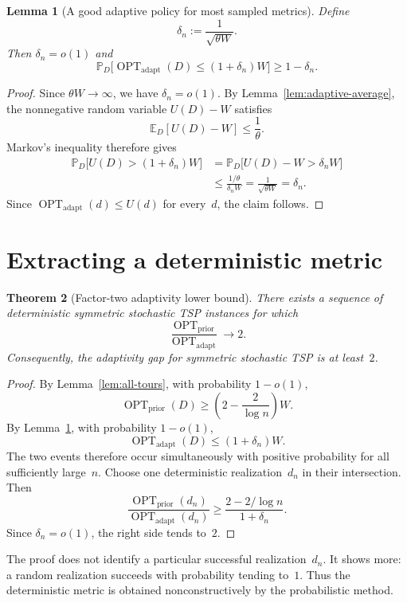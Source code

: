 \documentclass[11pt]{article}
\newtheorem{theorem}{Theorem}[section]
\newtheorem{lemma}[theorem]{Lemma}
\theoremstyle{remark}
\newcommand{\E}{\mathbb{E}}
\newcommand{\Prob}{\mathbb{P}}
\newcommand{\optadapt}{\operatorname{OPT}_{\mathrm{adapt}}}
\newcommand{\optprior}{\operatorname{OPT}_{\mathrm{prior}}}
\begin{document}
\begin{lemma}[A good adaptive policy for most sampled metrics]
\label{lem:adaptive-whp}
Define
\[
    \delta_n:=\frac{1}{\sqrt{\theta W}}.
\]
Then $\delta_n=o(1)$ and
\[
    \Prob_D\bigl[\optadapt(D)\leq(1+\delta_n)W\bigr]
    \geq 1-\delta_n.
\]
\end{lemma}

\begin{proof}
Since $\theta W\to\infty$, we have $\delta_n=o(1)$.  By
Lemma~\ref{lem:adaptive-average}, the nonnegative random variable $U(D)-W$
satisfies
\[
    \E_D[U(D)-W]\leq\frac{1}{\theta}.
\]
Markov's inequality therefore gives
\begin{align*}
    \Prob_D\bigl[U(D)>(1+\delta_n)W\bigr]
    &=
    \Prob_D\bigl[U(D)-W>\delta_nW\bigr]\\
    &\leq
    \frac{1/\theta}{\delta_nW}
    =\frac{1}{\sqrt{\theta W}}
    =\delta_n.
\end{align*}
Since $\optadapt(d)\leq U(d)$ for every~$d$, the claim follows.
\end{proof}

\section{Extracting a deterministic metric}

\begin{theorem}[Factor-two adaptivity lower bound]\label{thm:main}
There exists a sequence of deterministic symmetric stochastic TSP instances
for which
\[
    \frac{\optprior}{\optadapt}\longrightarrow 2.
\]
Consequently, the adaptivity gap for symmetric stochastic TSP is at least~$2$.
\end{theorem}

\begin{proof}
By Lemma~\ref{lem:all-tours}, with probability $1-o(1)$,
\[
    \optprior(D)\geq
    \left(2-\frac{2}{\log n}\right)W.
\]
By Lemma~\ref{lem:adaptive-whp}, with probability $1-o(1)$,
\[
    \optadapt(D)\leq(1+\delta_n)W.
\]
The two events therefore occur simultaneously with positive probability for all
sufficiently large~$n$.  Choose one deterministic realization~$d_n$ in their
intersection.  Then
\[
    \frac{\optprior(d_n)}{\optadapt(d_n)}
    \geq
    \frac{2-2/\log n}{1+\delta_n}.
\]
Since $\delta_n=o(1)$, the right side tends to~$2$.
\end{proof}

The proof does not identify a particular successful realization~$d_n$.  It
shows more: a random realization succeeds with probability tending to~$1$.
Thus the deterministic metric is obtained nonconstructively by the
probabilistic method.
\end{document}

